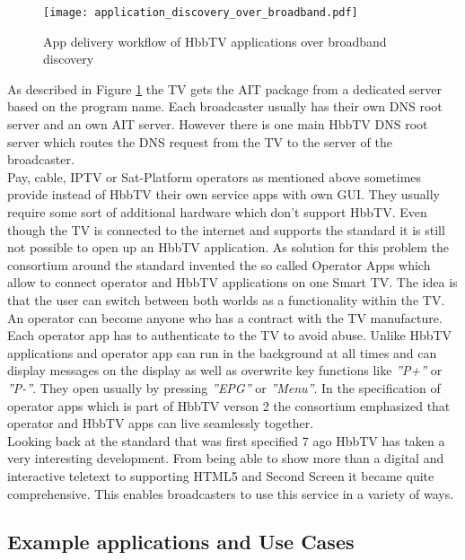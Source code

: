 \begin{figure}[htb]
  \centering
  \texttt{[image: application\_discovery\_over\_broadband.pdf]}\\
  \caption{App delivery workflow of HbbTV applications over broadband discovery}\label{fig:application_discovery_over_broadband}
\end{figure}

As described in Figure \ref{fig:application_discovery_over_broadband} the TV gets the AIT package
from a dedicated server based on the program name. Each broadcaster usually has their own DNS
root server and an own AIT server. However there is one main HbbTV DNS root server which routes the
DNS request from the TV to the server of the broadcaster.\\
Pay, cable, IPTV or Sat-Platform operators as mentioned above sometimes provide instead of HbbTV
their own service apps with own GUI. They usually require some sort of additional hardware which
don't support HbbTV. Even though the TV is connected to the internet and supports the standard
it is still not possible to open up an HbbTV application. As solution for this problem the
consortium around the standard invented the so called Operator Apps which allow to connect
operator and HbbTV applications on one Smart TV. The idea is that the user can switch between
both worlds as a functionality within the TV. An operator can become anyone who has a contract
with the TV manufacture. Each operator app has to authenticate to the TV to avoid abuse. Unlike
HbbTV applications and operator app can run in the background at all times and can display
messages on the display as well as overwrite key functions like \textit{''P+''} or \textit{''P-''}.
They open usually by pressing \textit{''EPG''} or \textit{''Menu''}. In the specification of
operator apps which is part of HbbTV verson 2 the consortium emphasized that operator and HbbTV
apps can live seamlessly together.\\
Looking back at the standard that was first specified 7 ago HbbTV has taken a very interesting
development. From being able to show more than a digital and interactive teletext to supporting
HTML5 and Second Screen it became quite comprehensive. This enables broadcasters to use this
service in a variety of ways.

\subsection{Example applications and Use Cases}

